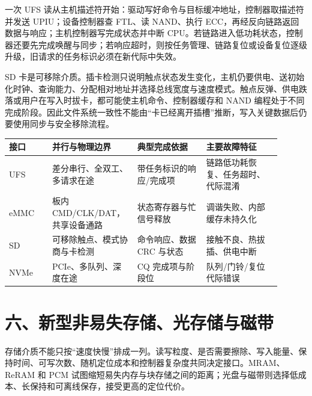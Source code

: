 一次 UFS 读从主机描述符开始：驱动写好命令与目标缓冲地址，控制器取描述符并发送 UPIU；设备控制器查 FTL、读 NAND、执行 ECC，再经反向链路返回数据与响应；主机控制器写完成状态并中断 CPU。若链路进入低功耗状态，控制器还要先完成唤醒与同步；若响应超时，则按任务管理、链路复位或设备复位逐级升级，旧请求的任务标识必须在新代际中失效。


SD 卡是可移除介质。插卡检测只说明触点状态发生变化，主机仍要供电、送初始化时钟、查询能力、分配相对地址并选择总线宽度与速度模式。触点反弹、供电跌落或用户在写入时拔卡，都可能使主机命令、控制器缓存和 NAND 编程处于不同完成阶段。因此文件系统一致性不能由“卡已经离开插槽”推断，写入关键数据后仍要使用同步与安全移除流程。

\begin{longtable}{L{0.15\linewidth}L{0.25\linewidth}L{0.24\linewidth}L{0.26\linewidth}}
\toprule
接口 & 并行与物理边界 & 典型完成依据 & 主要故障特征 \\
\midrule
UFS & 差分串行、全双工、多请求在途 & 带任务标识的响应/完成项 & 链路低功耗恢复、任务超时、代际混淆 \\\tablerowrule
eMMC & 板内 CMD/CLK/DAT，共享设备通路 & 状态寄存器与忙信号释放 & 调谐失败、内部缓存未持久化 \\\tablerowrule
SD & 可移除触点、模式协商与卡检测 & 命令响应、数据 CRC 与状态 & 接触不良、热拔插、供电中断 \\\tablerowrule
NVMe & PCIe、多队列、深度在途 & CQ 完成项与阶段位 & 队列/门铃/复位代际错误 \\
\bottomrule
\end{longtable}

\section{六、新型非易失存储、光存储与磁带}

存储介质不能只按“速度快慢”排成一列。读写粒度、是否需要擦除、写入能量、保持时间、可写次数、随机定位成本和控制器复杂度共同决定接口。MRAM、ReRAM 和 PCM 试图缩短易失内存与块存储之间的距离；光盘与磁带则选择低成本、长保持和可离线保存，接受更高的定位代价。

